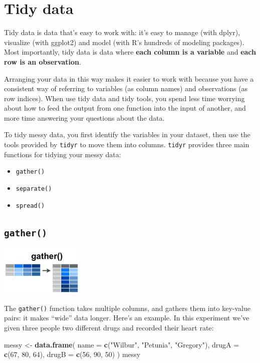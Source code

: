 \documentclass[
]{book}
\newenvironment{Shaded}{\begin{snugshade}}{\end{snugshade}}
\newcommand{\AttributeTok}[1]{\textcolor[rgb]{0.13,0.29,0.53}{#1}}
\newcommand{\DecValTok}[1]{\textcolor[rgb]{0.00,0.00,0.81}{#1}}
\newcommand{\FunctionTok}[1]{\textcolor[rgb]{0.13,0.29,0.53}{\textbf{#1}}}
\newcommand{\NormalTok}[1]{#1}
\newcommand{\OtherTok}[1]{\textcolor[rgb]{0.56,0.35,0.01}{#1}}
\newcommand{\StringTok}[1]{\textcolor[rgb]{0.31,0.60,0.02}{#1}}
\providecommand{\tightlist}{%
  \setlength{\itemsep}{0pt}\setlength{\parskip}{0pt}}
\begin{document}
\section{Tidy data}\label{tidy-data}

Tidy data is data that's easy to work with: it's easy to manage (with dplyr), visualize (with ggplot2) and model (with R's hundreds of modeling packages). Most importantly, tidy data is data where \textbf{each column is a variable} and \textbf{each row is an observation}.

Arranging your data in this way makes it easier to work with because you have a consistent way of referring to variables (as column names) and observations (as row indices). When use tidy data and tidy tools, you spend less time worrying about how to feed the output from one function into the input of another, and more time answering your questions about the data.

To tidy messy data, you first identify the variables in your dataset, then use the tools provided by \texttt{tidyr} to move them into columns. \texttt{tidyr} provides three main functions for tidying your messy data:

\begin{itemize}
\tightlist
\item
  \texttt{gather()}
\item
  \texttt{separate()}
\item
  \texttt{spread()}
\end{itemize}

\subsection*{\texorpdfstring{\texttt{gather()}}{gather()}}\label{gather}

\includegraphics{./figures/tidyr-gather.png}

The \texttt{gather()} function takes multiple columns, and gathers them into key-value pairs: it makes ``wide'' data longer. Here's an example. In this experiment we've given three people two different drugs and recorded their heart rate:

\begin{Shaded}
\begin{Highlighting}[]
\NormalTok{messy }\OtherTok{\textless{}{-}} \FunctionTok{data.frame}\NormalTok{(}
  \AttributeTok{name =} \FunctionTok{c}\NormalTok{(}\StringTok{"Wilbur"}\NormalTok{, }\StringTok{"Petunia"}\NormalTok{, }\StringTok{"Gregory"}\NormalTok{),}
  \AttributeTok{drugA =} \FunctionTok{c}\NormalTok{(}\DecValTok{67}\NormalTok{, }\DecValTok{80}\NormalTok{, }\DecValTok{64}\NormalTok{),}
  \AttributeTok{drugB =} \FunctionTok{c}\NormalTok{(}\DecValTok{56}\NormalTok{, }\DecValTok{90}\NormalTok{, }\DecValTok{50}\NormalTok{)}
\NormalTok{)}
\NormalTok{messy}
\end{Highlighting}
\end{Shaded}
\end{document}
